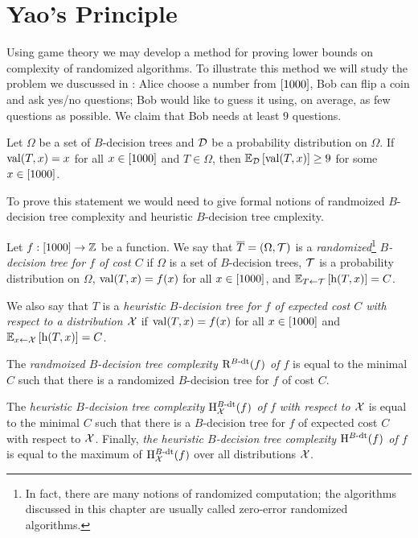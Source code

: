 \chapter{Yao's Principle}
Using game theory we may develop a method for proving lower bounds on complexity
of randomized algorithms. To illustrate this method we will study the problem we
duscussed in : Alice
choose a number from $\range{1000}$, Bob can flip a coin and ask yes/no
questions; Bob would like to guess it using, on average, as few questions as
possible. We claim that Bob needs at least $9$ questions.
\begin{theorem}
\label{theorem:randomized-dts-lower-bound}
  Let $\Omega$ be a set of $B$-decision trees and $\Distribution{D}$ be a
  probability distribution on $\Omega$. If $\DTValue{T}{x} = x$ for all 
  $x \in \range{1000}$ and $T \in \Omega$, then
  $\expectation[\Distribution{D}]{\DTValue{T}{x}} \ge 9$ for some $x \in
  \range{1000}$.
\end{theorem}

To prove this statement we would need to give formal notions of randmoized
$B$-decision tree complexity and heuristic $B$-decision tree cmplexity.
\begin{definition}
  Let $f : [1000] \to \Z$ be a function. We say that $\bar{T} = 
  (\Omega, \Distribution{T})$ is a \emph{randomized}\footnote{%
    In fact, there are many notions of randomized computation; the algorithms
    discussed in this chapter are usually called zero-error randomized
    algorithms.
  }
  \emph{$B$-decision tree for $f$ of cost $C$}
  if $\Omega$ is a set of $B$-decision trees, $\Distribution{T}$ is a
  probability distribution on $\Omega$, $\DTValue{T}{x} = f(x)$ for all $x \in
  \range{1000}$, and 
  $\expectation[T \gets \Distribution{T}]{\DTHeight[x]{T}} = C$.

  We also say that $T$ is a \emph{heuristic $B$-decision tree for $f$ of
  expected cost $C$ with respect to a distribution $\Distribution{X}$} if 
  $\DTValue{T}{x} = f(x)$ for all $x \in \range{1000}$ and
  $\expectation[x \gets \Distribution{X}]{\DTHeight[x]{T}} = C$.

  The \emph{randmoized $B$-decision tree complexity $\RandCBDT{f}$ of $f$}
  is equal to the minimal $C$ such that there is a randomized $B$-decision tree
  for $f$ of cost $C$.

  The \emph{heuristic $B$-decision tree complexity
  $\HeurCBDT[\Distribution{X}]{f}$ of $f$ with respect to $\Distribution{X}$} is
  equal to the minimal $C$ such that there is a $B$-decision tree for $f$ of
  expected cost $C$ with respect to $\Distribution{X}$. Finally, \emph{the
  heuristic $B$-decision tree complexity $\HeurCBDT{f}$ of $f$} is equal to the
  maximum of $\HeurCBDT[\Distribution{X}]{f}$ over all distributions
  $\Distribution{X}$.
\end{definition}

